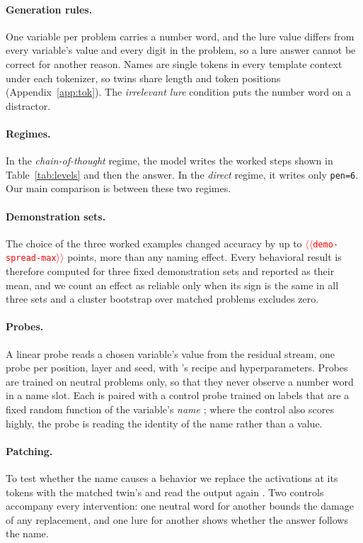 \documentclass[11pt]{article}
\providecommand{\NUM}[1]{\textcolor{red}{$\langle\langle$\texttt{#1}$\rangle\rangle$}}
\begin{document}
\paragraph{Generation rules.} One variable per problem carries a number word, and the lure value
differs from every variable's value and every digit in the problem, so a lure answer cannot be
correct for another reason. Names are single tokens in every template context under each
tokenizer, so twins share length and token positions (Appendix~\ref{app:tok}). The \emph{irrelevant lure}
condition puts the number word on a distractor.

\paragraph{Regimes.} In the \emph{chain-of-thought} regime, the model writes the worked steps
shown in Table~\ref{tab:levels} and then the answer. In the \emph{direct} regime, it writes only
\texttt{pen=6}. Our main comparison is between these two regimes.

\paragraph{Demonstration sets.} The choice of the three worked examples changed accuracy by up
to \NUM{demo-spread-max} points, more than any naming effect. Every behavioral result is therefore
computed for three fixed demonstration sets and reported as their mean, and we count an effect
as reliable only when its sign is the same in all three sets and a cluster bootstrap over
matched problems excludes zero.

\paragraph{Probes.} A linear probe reads a chosen variable's value from the residual stream,
one probe per position, layer and seed, with \citeauthor{kudo2026faithful}'s recipe and
hyperparameters. Probes are
trained on neutral problems only, so that they never observe a number word in a name slot. Each
is paired with a control probe trained on labels that are a fixed random function of the
variable's \emph{name} \cite{hewitt2019control}; where the control also scores highly, the probe
is reading the identity of the name rather than a value.

\paragraph{Patching.} To test whether the name causes a behavior we replace the activations at
its tokens with the matched twin's and read the output again \cite{zhang2024patching}. Two
controls accompany every intervention: one neutral word for another bounds the damage of any
replacement, and one lure for another shows whether the answer follows the name.
\end{document}
